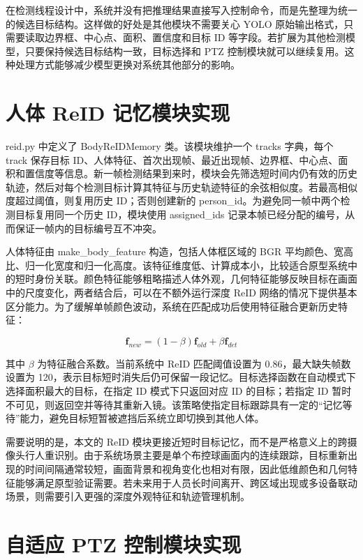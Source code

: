 在检测线程设计中，系统并没有把推理结果直接写入控制命令，而是先整理为统一的候选目标结构。这样做的好处是其他模块不需要关心 YOLO 原始输出格式，只需要读取边界框、中心点、面积、置信度和目标 ID 等字段。若扩展为其他检测模型，只要保持候选目标结构一致，目标选择和 PTZ 控制模块就可以继续复用。这种处理方式能够减少模型更换对系统其他部分的影响。

\section{人体 ReID 记忆模块实现}

reid.py 中定义了 BodyReIDMemory 类。该模块维护一个 tracks 字典，每个 track 保存目标 ID、人体特征、首次出现帧、最近出现帧、边界框、中心点、面积和置信度等信息。新一帧检测结果到来时，模块会先筛选短时间内仍有效的历史轨迹，然后对每个检测目标计算其特征与历史轨迹特征的余弦相似度。若最高相似度超过阈值，则复用历史 ID；否则创建新的 person\_id。为避免同一帧中两个检测目标复用同一个历史 ID，模块使用 assigned\_ids 记录本帧已经分配的编号，从而保证一帧内的目标编号互不冲突。

人体特征由 make\_body\_feature 构造，包括人体框区域的 BGR 平均颜色、宽高比、归一化宽度和归一化高度。该特征维度低、计算成本小，比较适合原型系统中的短时身份关联。颜色特征能够粗略描述人体外观，几何特征能够反映目标在画面中的尺度变化，两者结合后，可以在不额外运行深度 ReID 网络的情况下提供基本区分能力。为了缓解单帧颜色波动，系统在匹配成功后使用特征融合更新历史特征：

\begin{equation}
    \symbf{f}_{new} = (1-\beta)\symbf{f}_{old} + \beta\symbf{f}_{det}
\end{equation}

其中 $\beta$ 为特征融合系数。当前系统中 ReID 匹配阈值设置为 0.86，最大缺失帧数设置为 120，表示目标短时消失后仍可保留一段记忆。目标选择函数在自动模式下选择面积最大的目标，在指定 ID 模式下只返回对应 ID 的目标；若指定 ID 暂时不可见，则返回空并等待其重新入镜。该策略使指定目标跟踪具有一定的“记忆等待”能力，避免目标短暂被遮挡后系统立即切换到其他人体。

需要说明的是，本文的 ReID 模块更接近短时目标记忆，而不是严格意义上的跨摄像头行人重识别。由于系统场景主要是单个布控球画面内的连续跟踪，目标重新出现的时间间隔通常较短，画面背景和视角变化也相对有限，因此低维颜色和几何特征能够满足原型验证需要。若未来用于人员长时间离开、跨区域出现或多设备联动场景，则需要引入更强的深度外观特征和轨迹管理机制。

\section{自适应 PTZ 控制模块实现}

